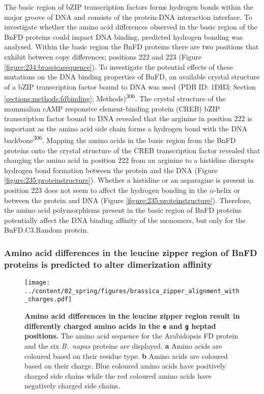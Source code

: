 \documentclass[12pt,]{book}
\begin{document}
The basic region of bZIP transcription factors forms hydrogen bonds
within the major groove of DNA and consists of the protein-DNA
interaction interface. To investigate whether the amino acid differences
observed in the basic region of the BnFD proteins could impact DNA
binding, predicted hydrogen bonding was analysed. Within the basic
region the BnFD proteins there are two positions that exhibit between
copy differences; positions 222 and 223 (Figure
\ref{figure:234:brassicasequence}). To investigate the potential effects
of these mutations on the DNA binding properties of BnFD, an available
crystal structure of a bZIP transcription factor bound to DNA was used
(PDB ID: 1DH3; Section \ref{sections:methods:fdbinding};
Methods)\textsuperscript{306}. The crystal structure of the mammalian
cAMP responsive element-binding protein (CREB) bZIP transcription factor
bound to DNA revealed that the arginine in position 222 is important as
the amino acid side chain forms a hydrogen bond with the DNA
backbone\textsuperscript{306}. Mapping the amino acids in the basic
region from the BnFD proteins onto the crystal structure of the CREB
transcription factor revealed that changing the amino acid in position
222 from an arginine to a histidine disrupts hydrogen bond formation
between the protein and the DNA (Figure
\ref{figure:235:proteinstructure}). Whether a histidine or an asparagine
is present in position 223 does not seem to affect the hydrogen bonding
in the \(\alpha\)-helix or between the protein and DNA (Figure
\ref{figure:235:proteinstructure}). Therefore, the amino acid
polymorphisms present in the basic region of BnFD proteins potentially
affect the DNA binding affinity of the monomers, but only for the
BnFD.C3.Random protein.

\subsubsection{Amino acid differences in the leucine zipper region of
BnFD proteins is predicted to alter dimerization
affinity}\label{section:spring:fddimerizationprediction}

\begin{figure}[htbp]
\centering
\texttt{[image: ../content/02\_spring/figures/brassica\_zipper\_alignment\_with\_charges.pdf]}
\caption{\textbf{Amino acid differences in the leucine zipper region
result in differently charged amino acids in the \texttt{e} and
\texttt{g} heptad positions.} The amino acid sequence for the
Arabidopsis FD protein and the six \emph{B.~napus} proteins are
displayed. \textbf{a} Amino acids are coloured based on their residue
type. \textbf{b} Amino acids are coloured based on their charge. Blue
coloured amino acids have positively charged side chains while the red
coloured amino acids have negatively charged side
chains.}\label{figure:236a:leucinezipper}
\end{figure}
\end{document}

